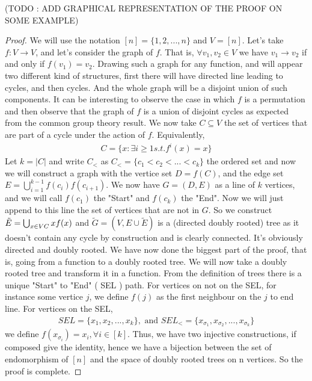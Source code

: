 (TODO : ADD GRAPHICAL REPRESENTATION OF THE PROOF ON SOME EXAMPLE)
\begin{proof}
We will use the notation $[n] = \{1, 2, ..., n\}$ and $V = [n]$.
Let's take $f:V \longrightarrow V$, and let's consider the graph of $f$. That is, $\forall v_1, v_2 \in V$ we have $v_1 \rightarrow v_2$ if and only if $f(v_1) = v_2$.
Drawing such a graph for any function, and will appear two different kind of structures, first there will have directed line leading to cycles, and then cycles. 
And the whole graph will be a disjoint union of such components.
It can be interesting to observe the case in which $f$ is a permutation and then observe that the graph of $f$ is a union of disjoint cycles as expected from the common group theory result.
\newline
We now take $C \subseteq V$ the set of vertices that are part of a cycle under the action of $f$. Equivalently,
\begin{align*}
    C = \{ x : \exists i \geq 1 s. t. f^i(x) = x \}
\end{align*}
Let $k = |C|$ and write $C_<$ as $C_< = \{c_1 < c_2 <...<c_k\}$ the ordered set and now we will construct a graph with the vertice set $D = f(C)$, and the edge set $E = \bigcup_{i=1}^{k-1} f(c_i)f(c_{i+1})$. We now have $G=(D, E)$ as a line of $k$ vertices, and we will call $f(c_1)$ the "Start" and $f(c_k)$ the "End".
\newline
Now we will just append to this line the set of vertices that are not in $G$. So we construct $\tilde{E} = \bigcup_{x \in V\\C} x f(x)$ and $\tilde{G} = (V, E\cup\tilde{E})$ is a (directed doubly rooted) tree as it doesn't contain any cycle by construction and is clearly connected. It's obviously directed and  doubly rooted.
We have now done the biggest part of the proof, that is, going from a function to a doubly rooted tree.
\newline
We will now take a doubly rooted tree and transform it in a function. From the definition of trees there is a unique "Start" to "End" ( SEL ) path.
\newline
For vertices on not on the SEL, for instance some vertice $j$, we define $f(j)$ as the first neighbour on the $j$ to end line.
\newline
For vertices on the SEL, 
\begin{align}
    SEL = \{x_1, x_2, ..., x_k\}, \text{ and } SEL_< = \{x_{\sigma_1}, x_{\sigma_2}, ..., x_{\sigma_k}\} 
\end{align}
we define $f(x_{\sigma_i}) = x_i, \forall i \in [k]$.
\newline
Thus, we have two injective constructions, if composed give the identity, hence we have a bijection between the set of endomorphism of $[n]$ and the space of doubly rooted trees on n vertices. So the proof is complete.
\end{proof}
